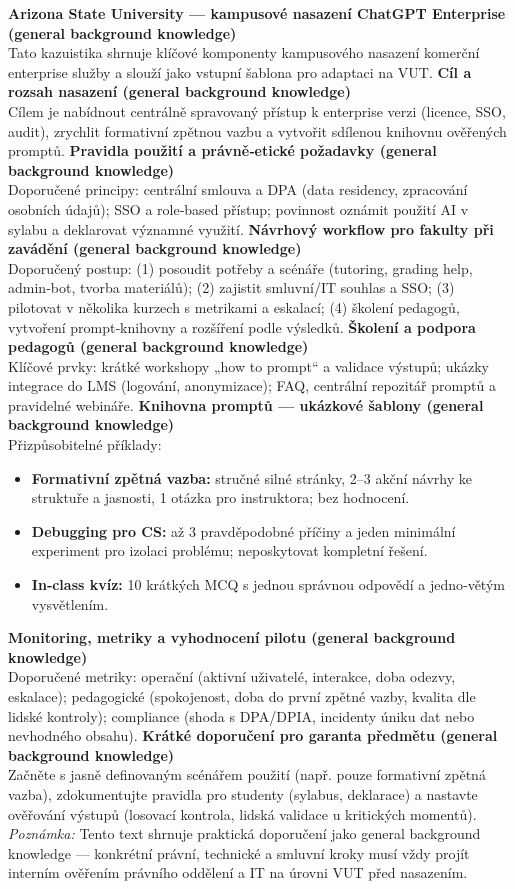 \medskip
\textbf{Arizona State University — kampusové nasazení ChatGPT Enterprise (general background knowledge)}\\
Tato kazuistika shrnuje klíčové komponenty kampusového nasazení komerční enterprise služby a slouží jako vstupní šablona pro adaptaci na VUT.
\medskip
\textbf{Cíl a rozsah nasazení (general background knowledge)}\\
Cílem je nabídnout centrálně spravovaný přístup k enterprise verzi (licence, SSO, audit), zrychlit formativní zpětnou vazbu a vytvořit sdílenou knihovnu ověřených promptů.
\medskip
\textbf{Pravidla použití a právně‑etické požadavky (general background knowledge)}\\
Doporučené principy: centrální smlouva a DPA (data residency, zpracování osobních údajů); SSO a role‑based přístup; povinnost oznámit použití AI v sylabu a deklarovat významné využití.
\medskip
\textbf{Návrhový workflow pro fakulty při zavádění (general background knowledge)}\\
Doporučený postup: (1) posoudit potřeby a scénáře (tutoring, grading help, admin‑bot, tvorba materiálů); (2) zajistit smluvní/IT souhlas a SSO; (3) pilotovat v několika kurzech s metrikami a eskalací; (4) školení pedagogů, vytvoření prompt‑knihovny a rozšíření podle výsledků.
\medskip
\textbf{Školení a podpora pedagogů (general background knowledge)}\\
Klíčové prvky: krátké workshopy „how to prompt“ a validace výstupů; ukázky integrace do LMS (logování, anonymizace); FAQ, centrální repozitář promptů a pravidelné webináře.
\medskip
\textbf{Knihovna promptů — ukázkové šablony (general background knowledge)}\\
Přizpůsobitelné příklady: \\
\begin{itemize}
  \item \textbf{Formativní zpětná vazba:} stručné silné stránky, 2–3 akční návrhy ke struktuře a jasnosti, 1 otázka pro instruktora; bez hodnocení.
  \item \textbf{Debugging pro CS:} až 3 pravděpodobné příčiny a jeden minimální experiment pro izolaci problému; neposkytovat kompletní řešení.
  \item \textbf{In‑class kvíz:} 10 krátkých MCQ s jednou správnou odpovědí a jedno‑větým vysvětlením.
\end{itemize}
\medskip
\textbf{Monitoring, metriky a vyhodnocení pilotu (general background knowledge)}\\
Doporučené metriky: operační (aktivní uživatelé, interakce, doba odezvy, eskalace); pedagogické (spokojenost, doba do první zpětné vazby, kvalita dle lidské kontroly); compliance (shoda s DPA/DPIA, incidenty úniku dat nebo nevhodného obsahu).
\medskip
\textbf{Krátké doporučení pro garanta předmětu (general background knowledge)}\\
Začněte s jasně definovaným scénářem použití (např. pouze formativní zpětná vazba), zdokumentujte pravidla pro studenty (sylabus, deklarace) a nastavte ověřování výstupů (losovací kontrola, lidská validace u kritických momentů).
\medskip
\textit{Poznámka:} Tento text shrnuje praktická doporučení jako general background knowledge — konkrétní právní, technické a smluvní kroky musí vždy projít interním ověřením právního oddělení a IT na úrovni VUT před nasazením.
